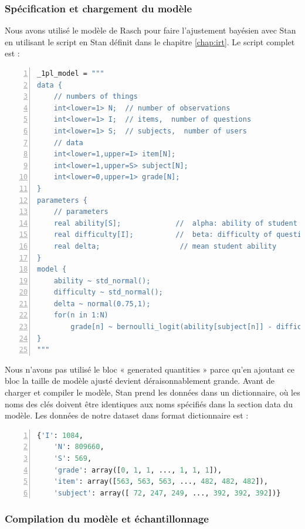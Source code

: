 \subsubsection{Spécification et chargement du modèle}
Nous avons utilisé le modèle de Rasch pour faire l’ajustement bayésien avec Stan en utilisant le script en Stan définit dans le chapitre \ref{chap:irt}. Le script complet est :
\begin{lstlisting}[language=Stan,basicstyle=\scriptsize, frame=l,framesep=4.5mm,framexleftmargin=2.5mm,tabsize=2,numbers=left,fillcolor=\color{blueforest!70},rulecolor=\color{blueforest},numberstyle=\normalfont\tiny\color{white}]
_1pl_model = """
data {
	// numbers of things
	int<lower=1> N;  // number of observations
	int<lower=1> I;  // items,  number of questions  
	int<lower=1> S;  // subjects,  number of users 
	// data
	int<lower=1,upper=I> item[N];
	int<lower=1,upper=S> subject[N];
	int<lower=0,upper=1> grade[N];
}
parameters {
	// parameters
	real ability[S];             //  alpha: ability of student
	real difficulty[I];          //  beta: difficulty of question
	real delta;                   // mean student ability
}
model {
	ability ~ std_normal();         
	difficulty ~ std_normal();   
	delta ~ normal(0.75,1);
	for(n in 1:N)
		grade[n] ~ bernoulli_logit(ability[subject[n]] - difficulty[item[n]] + delta);
}
"""
\end{lstlisting}
Nous n’avons pas utilisé le bloc « generated quantities » parce qu’en ajoutant ce bloc la taille de modèle ajusté devient déraisonnablement grande. Avant de charger et compiler le modèle, Stan prend les données dans un dictionnaire, où les noms des clés doivent être identiques aux noms spécifiés dans la section data du modèle. Les données de notre dataset dans format dictionnaire est :

\begin{lstlisting}[language=Python,basicstyle=\scriptsize, frame=l,framesep=4.5mm,framexleftmargin=2.5mm,tabsize=2,numbers=left,fillcolor=\color{blueforest!70},rulecolor=\color{blueforest},numberstyle=\normalfont\tiny\color{white}]
	{'I': 1084,
	'N': 809660,
	'S': 569,
	'grade': array([0, 1, 1, ..., 1, 1, 1]),
	'item': array([563, 563, 563, ..., 482, 482, 482]),
	'subject': array([ 72, 247, 249, ..., 392, 392, 392])}
\end{lstlisting}

\subsubsection{Compilation du modèle et échantillonnage }

